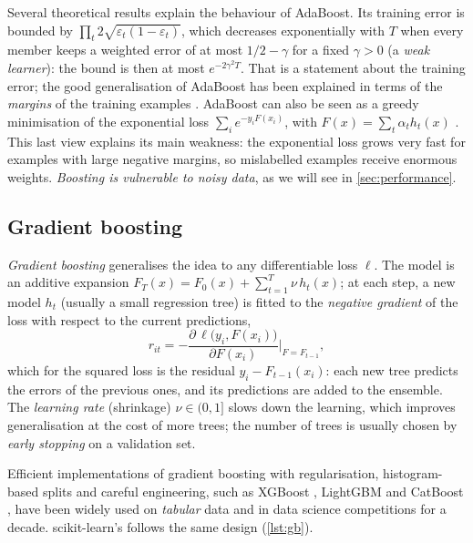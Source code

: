 Several theoretical results explain the behaviour of AdaBoost. Its training error is bounded by
$\prod_t2\sqrt{\varepsilon_t(1-\varepsilon_t)}$, which decreases exponentially with $T$ when every
member keeps a weighted error of at most $1/2-\gamma$ for a fixed $\gamma>0$ (a \emph{weak learner}): the
bound is then at most $e^{-2\gamma^2T}$. That is a statement about the training error; the good generalisation
of AdaBoost
has been explained in terms of the \emph{margins} of the training examples
\citep{schapire1998boosting}. AdaBoost can also be seen as a greedy minimisation of the
exponential loss $\sum_i e^{-y_iF(x_i)}$, with $F(x)=\sum_t\alpha_th_t(x)$
\citep{friedman2000additive}. This last view explains its main weakness: the exponential loss
grows very fast for examples with large negative margins, so mislabelled examples receive
enormous weights. \emph{Boosting is vulnerable to noisy data}, as we will see in
\cref{sec:performance}.

\subsection{Gradient boosting}

\emph{Gradient boosting} \citep{friedman2001greedy} generalises the idea to any differentiable
loss $\ell$. The model is an additive expansion $F_T(x)=F_0(x)+\sum_{t=1}^{T}\nu\,h_t(x)$; at each
step, a new model $h_t$ (usually a small regression tree) is fitted to the \emph{negative
gradient} of the loss with respect to the current predictions,
\begin{equation}
  r_{it}=-\frac{\partial\,\ell\bigl(y_i,F(x_i)\bigr)}{\partial F(x_i)}\Big|_{F=F_{t-1}},
\end{equation}
which for the squared loss is the residual $y_i-F_{t-1}(x_i)$: each new tree predicts the
errors of the previous ones, and its predictions are added to the ensemble. The \emph{learning
rate} (shrinkage) $\nu\in(0,1]$ slows down the learning, which improves generalisation at the
cost of more trees; the number of trees is usually chosen by \emph{early stopping} on a
validation set.

Efficient implementations of gradient boosting with regularisation, histogram-based splits and
careful engineering, such as XGBoost \citep{chen2016xgboost}, LightGBM \citep{ke2017lightgbm} and
CatBoost \citep{prokhorenkova2018catboost}, have been widely used on
\emph{tabular} data and in data science competitions for a decade. scikit-learn's
 follows the same design (\cref{lst:gb}).

